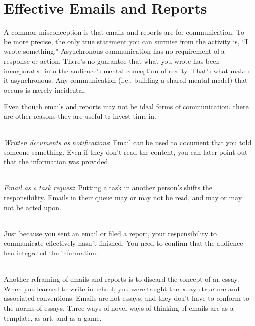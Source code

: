 \section{Effective Emails and Reports}


A common misconception is that emails and reports are for communication. To be more precise, the only true statement you can surmise from the activity is, ``I wrote something." 
Asynchronous communication has no requirement of a response or action. There's no guarantee that what you wrote has been incorporated into the audience's mental conception of reality. That's what makes it asynchronous. Any communication (i.e., building a shared mental model) that occurs is merely incidental.

Even though emails and reports may not be ideal forms of communication, there are other reasons they are useful to invest time in.

\ \\
\textit{Written documents as notifications}: Email can be used to document that you told someone something. Even if they don't read the content, you can later point out that the information was provided.

\ \\
\textit{Email as a task request}: Putting a task in another person's shifts the responsibility. Emails in their queue may or may not be read, and may or may not be acted upon. 

\ \\
Just because you sent an email or filed a report, your responsibility to communicate effectively hasn't finished. You need to confirm that the audience has integrated the information. 

\ \\


Another reframing of emails and reports is to discard the concept of an essay. When you learned to write in school, you were taught the essay structure and associated conventions. Emails are not essays, and they don't have to conform to the norms of essays. Three ways of novel ways of thinking of emails are as a template, as art, and as a game.

